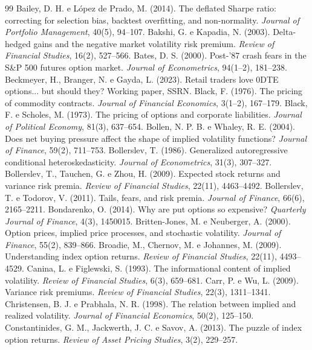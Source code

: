 \documentclass[11pt,a4paper]{article}
\begin{document}
\begin{thebibliography}{99}\small
\bibitem{} Bailey, D. H. e López de Prado, M. (2014). The deflated Sharpe ratio: correcting for selection bias, backtest overfitting, and non-normality. \emph{Journal of Portfolio Management}, 40(5), 94--107.
\bibitem{} Bakshi, G. e Kapadia, N. (2003). Delta-hedged gains and the negative market volatility risk premium. \emph{Review of Financial Studies}, 16(2), 527--566.
\bibitem{} Bates, D. S. (2000). Post-'87 crash fears in the S\&P 500 futures option market. \emph{Journal of Econometrics}, 94(1--2), 181--238.
\bibitem{} Beckmeyer, H., Branger, N. e Gayda, L. (2023). Retail traders love 0DTE options... but should they? Working paper, SSRN.
\bibitem{} Black, F. (1976). The pricing of commodity contracts. \emph{Journal of Financial Economics}, 3(1--2), 167--179.
\bibitem{} Black, F. e Scholes, M. (1973). The pricing of options and corporate liabilities. \emph{Journal of Political Economy}, 81(3), 637--654.
\bibitem{} Bollen, N. P. B. e Whaley, R. E. (2004). Does net buying pressure affect the shape of implied volatility functions? \emph{Journal of Finance}, 59(2), 711--753.
\bibitem{} Bollerslev, T. (1986). Generalized autoregressive conditional heteroskedasticity. \emph{Journal of Econometrics}, 31(3), 307--327.
\bibitem{} Bollerslev, T., Tauchen, G. e Zhou, H. (2009). Expected stock returns and variance risk premia. \emph{Review of Financial Studies}, 22(11), 4463--4492.
\bibitem{} Bollerslev, T. e Todorov, V. (2011). Tails, fears, and risk premia. \emph{Journal of Finance}, 66(6), 2165--2211.
\bibitem{} Bondarenko, O. (2014). Why are put options so expensive? \emph{Quarterly Journal of Finance}, 4(3), 1450015.
\bibitem{} Britten-Jones, M. e Neuberger, A. (2000). Option prices, implied price processes, and stochastic volatility. \emph{Journal of Finance}, 55(2), 839--866.
\bibitem{} Broadie, M., Chernov, M. e Johannes, M. (2009). Understanding index option returns. \emph{Review of Financial Studies}, 22(11), 4493--4529.
\bibitem{} Canina, L. e Figlewski, S. (1993). The informational content of implied volatility. \emph{Review of Financial Studies}, 6(3), 659--681.
\bibitem{} Carr, P. e Wu, L. (2009). Variance risk premiums. \emph{Review of Financial Studies}, 22(3), 1311--1341.
\bibitem{} Christensen, B. J. e Prabhala, N. R. (1998). The relation between implied and realized volatility. \emph{Journal of Financial Economics}, 50(2), 125--150.
\bibitem{} Constantinides, G. M., Jackwerth, J. C. e Savov, A. (2013). The puzzle of index option returns. \emph{Review of Asset Pricing Studies}, 3(2), 229--257.

\end{thebibliography}
\end{document}
